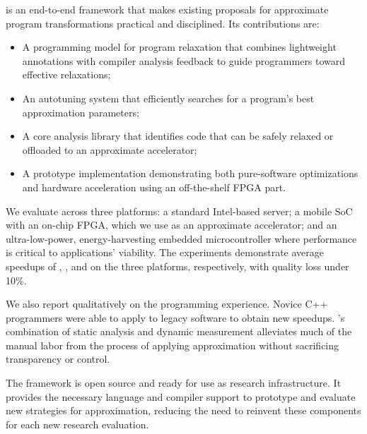 \sysname is an end-to-end framework that makes existing proposals for approximate
program transformations practical and disciplined.
Its contributions are:
\begin{itemize}
\item A programming model for program relaxation that combines lightweight
annotations with compiler analysis feedback
to guide programmers toward effective relaxations;

\item An autotuning system that efficiently searches for a program's
best approximation parameters;

\item A core analysis library that identifies code that can be safely relaxed
or offloaded to an approximate accelerator;

\item A prototype implementation demonstrating both pure-software optimizations
and hardware acceleration using an off-the-shelf FPGA part.
\end{itemize}

\noindent
We evaluate \sysname across three platforms:
a standard Intel-based server;
a mobile SoC with an on-chip FPGA, which we use as an approximate accelerator;
and an ultra-low-power, energy-harvesting embedded microcontroller where
performance is critical to applications' viability.
The experiments demonstrate average speedups of ,
, and  on the
three platforms, respectively,
with quality loss under 10\%.

We also report qualitatively on the programming experience.
Novice C++ programmers were able to apply \sysname to
legacy software to obtain new speedups.
\sysname's combination of static analysis and dynamic measurement alleviates
much of the manual labor from the process of applying
approximation without sacrificing transparency or control.

The \sysname framework is open source and ready for use as research
infrastructure.
It provides the necessary language and compiler support to prototype and
evaluate new strategies for approximation,
reducing the need to reinvent these components for each new research
evaluation.
